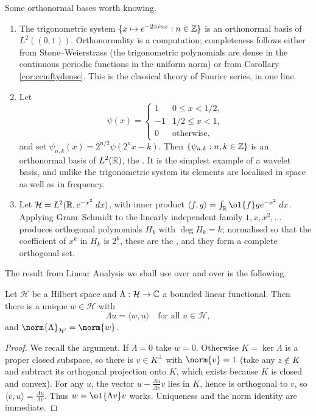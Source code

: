 \documentclass[a4paper]{scrartcl}
\newcommand{\ip}[2]{\langle #1, #2 \rangle}
\newcommand{\Hil}{\mathcal{H}}
\begin{document}
\begin{example}\label{ex:onb}
	Some orthonormal bases worth knowing.
	\begin{enumerate}[label=(\roman*)]
		\item The trigonometric system $\{x \mapsto e^{-2\pi i n x} : n \in \mathbb{Z}\}$ is an orthonormal basis of $L^2((0,1))$. Orthonormality is a computation; completeness follows either from Stone--Weierstrass (the trigonometric polynomials are dense in the continuous periodic functions in the uniform norm) or from Corollary \ref{cor:ccinftydense}. This is the classical theory of Fourier series, in one line.
		\item Let
		$$\psi(x) = \begin{cases} 1 & 0 \le x < 1/2, \\ -1 & 1/2 \le x < 1, \\ 0 & \text{otherwise},\end{cases}$$
		and set $\psi_{n,k}(x) = 2^{n/2}\psi(2^n x - k)$. Then $\{\psi_{n,k} : n, k \in \mathbb{Z}\}$ is an orthonormal basis of $L^2(\mathbb{R})$, the . It is the simplest example of a wavelet basis, and unlike the trigonometric system its elements are localised in space as well as in frequency.
		\item Let $\Hil = L^2(\R, e^{-x^2}\dd x)$, with inner product $\ip{f}{g} = \int_\R \ol{f} g e^{-x^2} \dd x$. Applying Gram--Schmidt to the linearly independent family $1, x, x^2, \dots$ produces orthogonal polynomials $H_k$ with $\deg H_k = k$; normalised so that the coefficient of $x^k$ in $H_k$ is $2^k$, these are the , and they form a complete orthogonal set.
	\end{enumerate}
\end{example}

The result from Linear Analysis we shall use over and over is the following.

\begin{theorem}\label{thm:rieszhilbert}
	Let $\Hil$ be a Hilbert space and $\Lambda : \Hil \to \C$ a bounded linear functional. Then there is a unique $w \in \Hil$ with
	$$\Lambda u = \ip{w}{u} \quad \text{for all } u \in \Hil,$$
	and $\norm{\Lambda}_{\Hil'} = \norm{w}$.
\end{theorem}

\begin{proof}
	We recall the argument. If $\Lambda = 0$ take $w = 0$. Otherwise $K = \ker \Lambda$ is a proper closed subspace, so there is $v \in K^\perp$ with $\norm{v} = 1$ (take any $z \notin K$ and subtract its orthogonal projection onto $K$, which exists because $K$ is closed and convex). For any $u$, the vector $u - \frac{\Lambda u}{\Lambda v} v$ lies in $K$, hence is orthogonal to $v$, so $\ip{v}{u} = \frac{\Lambda u}{\Lambda v}$. Thus $w = \ol{\Lambda v} v$ works. Uniqueness and the norm identity are immediate.
\end{proof}
\end{document}
